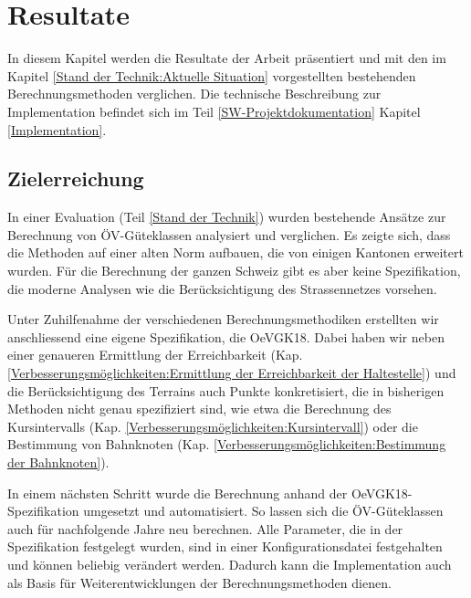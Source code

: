 
\section{Resultate}
\label{Resultate}

In diesem Kapitel werden die Resultate der Arbeit präsentiert und mit den im Kapitel \ref{Stand der Technik:Aktuelle Situation} vorgestellten bestehenden Berechnungsmethoden verglichen.
Die technische Beschreibung zur Implementation befindet sich im Teil \ref{SW-Projektdokumentation} Kapitel \ref{Implementation}.

\subsection{Zielerreichung}
\label{Resultate:Zielerreichung}

In einer Evaluation (Teil \ref{Stand der Technik}) wurden bestehende Ansätze zur Berechnung von \acs{ÖV}-Güteklassen analysiert und verglichen.
Es zeigte sich, dass die Methoden auf einer alten Norm aufbauen, die von einigen Kantonen erweitert wurden.
Für die Berechnung der ganzen Schweiz gibt es aber keine Spezifikation, die moderne Analysen wie die Berücksichtigung des Strassennetzes vorsehen.

Unter Zuhilfenahme der verschiedenen Berechnungsmethodiken erstellten wir anschliessend eine eigene Spezifikation, die \gls{OeVGK18}.
Dabei haben wir neben einer genaueren Ermittlung der Erreichbarkeit (Kap. \ref{Verbesserungsmöglichkeiten:Ermittlung der Erreichbarkeit der Haltestelle}) und die Berücksichtigung des Terrains auch Punkte konkretisiert, die in bisherigen Methoden nicht genau spezifiziert sind, wie etwa die Berechnung des Kursintervalls (Kap. \ref{Verbesserungsmöglichkeiten:Kursintervall}) oder die Bestimmung von Bahnknoten (Kap. \ref{Verbesserungsmöglichkeiten:Bestimmung der Bahnknoten}).

In einem nächsten Schritt wurde die Berechnung anhand der \gls{OeVGK18}-Spezifikation umgesetzt und automatisiert.
So lassen sich die \acs{ÖV}-Güteklassen auch für nachfolgende Jahre neu berechnen.
Alle Parameter, die in der Spezifikation festgelegt wurden, sind in einer Konfigurationsdatei festgehalten und können beliebig verändert werden.
Dadurch kann die Implementation auch als Basis für Weiterentwicklungen der Berechnungsmethoden dienen.

